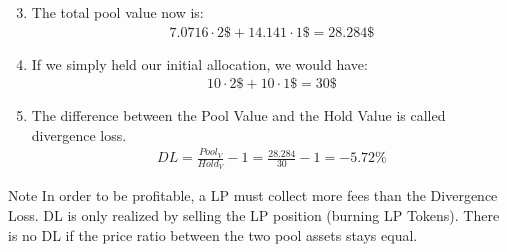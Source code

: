 \documentclass[]{beamer}
\begin{document}
\begin{frame}
	\begin{enumerate}
	\setcounter{enumi}{2}
		\item The total pool value now is: 
			\begin{align*}
			7.0716 \cdot 2 \$ + 14.141 \cdot 1 \$ = 	28.284 \$
			\end{align*}
		\item If we simply held our initial allocation, we would have:
			\begin{align*}
			10 \cdot 2 \$ + 10 \cdot 1 \$ = 	30 \$
			\end{align*}
		\item The difference between the Pool Value and the Hold Value is called divergence loss.
		\begin{align*}
			DL = \tfrac{Pool_V}{Hold_V} -1 = \tfrac{28.284}{30} - 1 = -5.72 \%
			\end{align*}
	\end{enumerate}	
\begin{keytakeaway}{Note}
	In order to be profitable, a LP must collect more fees than the Divergence Loss. DL is only realized by selling the LP position (burning LP Tokens). There is no DL if the price ratio between the two pool assets stays equal.
\end{keytakeaway}

\end{frame}
\end{document}
